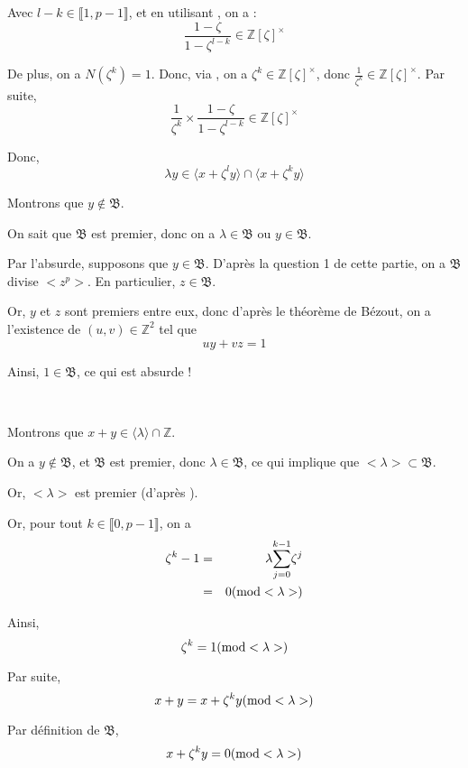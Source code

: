 Avec $l - k \in \llbracket 1, p - 1 \rrbracket$, et en utilisant , on a :
\[ \frac{1 - \zeta}{1 - \zeta^{l - k}} \in \mathbb{Z} [\zeta]^{\times} \]


De plus, on a $N (\zeta^k) = 1$. Donc, via , on a $\zeta^k \in \mathbb{Z} [\zeta]^{\times}$, donc
$\frac{1}{\zeta^k} \in \mathbb{Z} [\zeta]^{\times}$. Par suite,
\[ \frac{1}{\zeta^k} \times \frac{1 - \zeta}{1 - \zeta^{l - k}} \in \mathbb{Z}
   [\zeta]^{\times} \]


Donc,
\[ \lambda y \in \langle x + \zeta^l y \rangle \cap \langle x + \zeta^k y
   \rangle \]


 Montrons que $y \nin \mathfrak{B}$.

On sait que $\mathfrak{B}$ est premier, donc on a $\lambda \in \mathfrak{B}$
ou $y \in \mathfrak{B}$.

Par l'absurde, supposons que $y \in \mathfrak{B}$. D'apr{\`e}s la question 1
de cette partie, on a $\mathfrak{B}$ divise{\tmem{}} $< z^p >$. En
particulier, $z \in \mathfrak{B}$.

Or, $y$ et $z$ sont premiers entre eux, donc d'apr{\`e}s le th{\'e}or{\`e}me
de B{\'e}zout, on a l'existence de $(u, v) \in \mathbb{Z}^2$ tel que
\[ u y + v z = 1 \]


Ainsi, $1 \in \mathfrak{B}$, ce qui est absurde !

\

Montrons que $x + y \in \langle \lambda \rangle \cap \mathbb{Z}$.

On a $y \nin \mathfrak{B}$, et $\mathfrak{B}$ est premier, donc $\lambda \in
\mathfrak{B}$, ce qui implique que $< \lambda > \subset \mathfrak{B}$.

Or, $< \lambda >$ est premier (d'apr{\`e}s ).

Or, pour tout $k \in \llbracket 0, p - 1 \rrbracket$, on a
\begin{eqnarray*}
  \zeta^k - 1 & = & \lambda \underset{j = 0}{\overset{k - 1}{\sum}} \zeta^j\\
  & = & 0 (\operatorname{mod} < \lambda >)
\end{eqnarray*}


Ainsi,
\[ \zeta^k = 1 (\operatorname{mod} < \lambda >) \]


Par suite,
\[ x + y = x + \zeta^k y (\operatorname{mod} < \lambda >) \]


Par d{\'e}finition de $\mathfrak{B}$,
\[ x + \zeta^k y = 0 (\operatorname{mod} < \lambda >) \]


